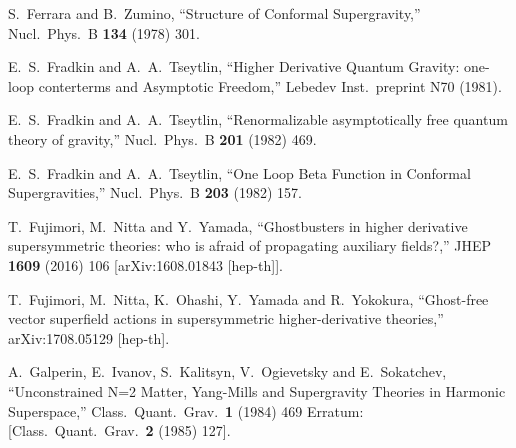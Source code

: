 \begin{thebibliography}{99}


  S.~Ferrara and B.~Zumino,
  ``Structure of Conformal Supergravity,''
  Nucl.\ Phys.\ B {\bf 134} (1978) 301.
  
  
  E.~S.~Fradkin and A.~A.~Tseytlin,
  ``Higher Derivative Quantum Gravity: one-loop conterterms and Asymptotic Freedom,''
  Lebedev Inst.\ preprint N70 (1981).
  
  

  E.~S.~Fradkin and A.~A.~Tseytlin,
  ``Renormalizable asymptotically free quantum theory of gravity,''
  Nucl.\ Phys.\ B {\bf 201} (1982) 469.
  
  


  E.~S.~Fradkin and A.~A.~Tseytlin,
  ``One Loop Beta Function in Conformal Supergravities,''
  Nucl.\ Phys.\ B {\bf 203} (1982) 157.
  
  
  T.~Fujimori, M.~Nitta and Y.~Yamada,
  ``Ghostbusters in higher derivative supersymmetric theories: who is afraid of propagating auxiliary fields?,''
  JHEP {\bf 1609} (2016) 106
  [arXiv:1608.01843 [hep-th]].
  
  
  T.~Fujimori, M.~Nitta, K.~Ohashi, Y.~Yamada and R.~Yokokura,
  ``Ghost-free vector superfield actions in supersymmetric higher-derivative theories,''
  arXiv:1708.05129 [hep-th].
  
  

  
  

  A.~Galperin, E.~Ivanov, S.~Kalitsyn, V.~Ogievetsky and E.~Sokatchev,
  ``Unconstrained N=2 Matter, Yang-Mills and Supergravity Theories in Harmonic Superspace,''
  Class.\ Quant.\ Grav.\  {\bf 1} (1984) 469
   Erratum: [Class.\ Quant.\ Grav.\  {\bf 2} (1985) 127].
  

\end{thebibliography}
